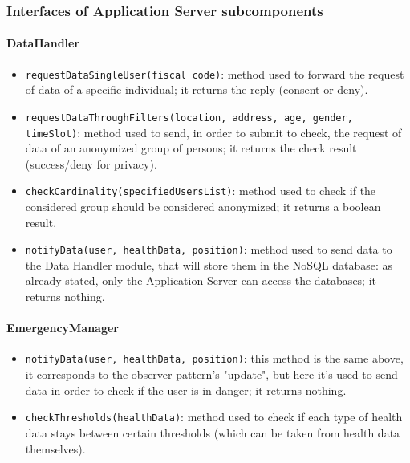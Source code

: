 \subsubsection{Interfaces of Application Server subcomponents}
\paragraph{DataHandler}

\begin{itemize}
\item[ ]\texttt{requestDataSingleUser(fiscal code)}: method used to forward the request of data of a specific individual; it returns the reply (consent or deny).

\item[ ]\texttt{requestDataThroughFilters(location, address, age, gender, timeSlot)}: method us\-ed to send, in order to submit to check, the request of data of an anonymized group of persons; it returns the check result (success/deny for privacy).

\item[ ]\texttt{checkCardinality(specifiedUsersList)}: method used to check if the considered group should be considered anonymized; it returns a boolean result.

\item[ ]\texttt{notifyData(user, healthData, position)}: method used to send data to the Data Handler module, that will store them in the NoSQL database: as already stated, only the Application Server can access the databases; it returns nothing.
\end{itemize}

\paragraph{EmergencyManager}

\begin{itemize}
\item[ ]\texttt{notifyData(user, healthData, position)}: this method is the same above, it corresponds to the observer pattern's "update", but here it's used to send data in order to check if the user is in danger; it returns nothing.

\item[ ]\texttt{checkThresholds(healthData)}: method used to check if each type of health data stays between certain thresholds (which can be taken from health data themselves).
\end{itemize}

